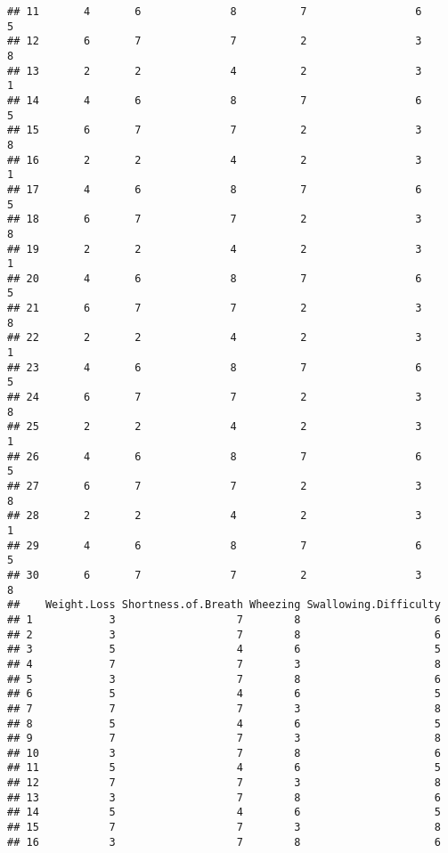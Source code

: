 \documentclass[]{article}
\begin{document}
\begin{verbatim}
## 11       4       6              8          7                 6       5
## 12       6       7              7          2                 3       8
## 13       2       2              4          2                 3       1
## 14       4       6              8          7                 6       5
## 15       6       7              7          2                 3       8
## 16       2       2              4          2                 3       1
## 17       4       6              8          7                 6       5
## 18       6       7              7          2                 3       8
## 19       2       2              4          2                 3       1
## 20       4       6              8          7                 6       5
## 21       6       7              7          2                 3       8
## 22       2       2              4          2                 3       1
## 23       4       6              8          7                 6       5
## 24       6       7              7          2                 3       8
## 25       2       2              4          2                 3       1
## 26       4       6              8          7                 6       5
## 27       6       7              7          2                 3       8
## 28       2       2              4          2                 3       1
## 29       4       6              8          7                 6       5
## 30       6       7              7          2                 3       8
##    Weight.Loss Shortness.of.Breath Wheezing Swallowing.Difficulty
## 1            3                   7        8                     6
## 2            3                   7        8                     6
## 3            5                   4        6                     5
## 4            7                   7        3                     8
## 5            3                   7        8                     6
## 6            5                   4        6                     5
## 7            7                   7        3                     8
## 8            5                   4        6                     5
## 9            7                   7        3                     8
## 10           3                   7        8                     6
## 11           5                   4        6                     5
## 12           7                   7        3                     8
## 13           3                   7        8                     6
## 14           5                   4        6                     5
## 15           7                   7        3                     8
## 16           3                   7        8                     6

\end{verbatim}
\end{document}
